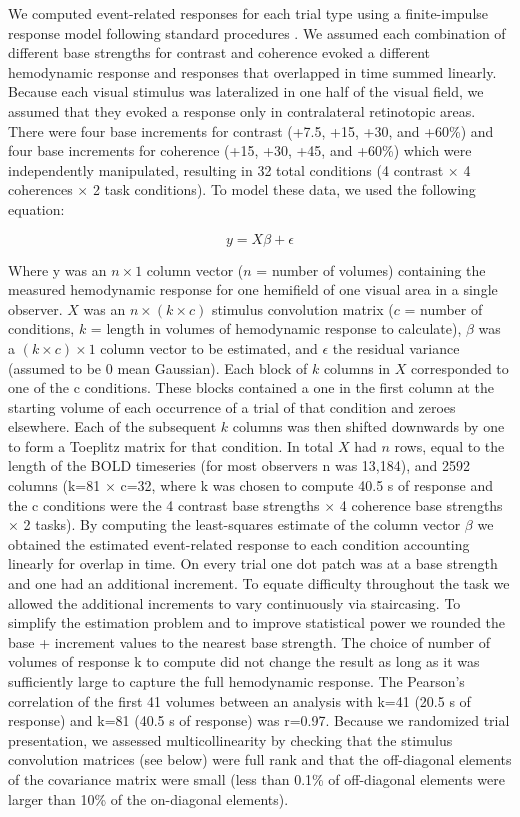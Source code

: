 We computed event-related responses for each trial type using a finite-impulse response model \citep{Zarahn1997-jc} following standard procedures \citep{Gardner2005-pg}. We assumed each combination of different base strengths for contrast and coherence evoked a different hemodynamic response and responses that overlapped in time summed linearly. Because each visual stimulus was lateralized in one half of the visual field, we assumed that they evoked a response only in contralateral retinotopic areas. There were four base increments for contrast (+7.5, +15, +30, and +60\%) and four base increments for coherence (+15, +30, +45, and +60\%) which were independently manipulated, resulting in 32 total conditions (4 contrast $\times$ 4 coherences $\times$ 2 task conditions). To model these data, we used the following equation:

\begin{equation}
    y=X\beta + \epsilon
\end{equation}

Where y was an $n\times1$ column vector ($n$ = number of volumes) containing the measured hemodynamic response for one hemifield of one visual area in a single observer. $X$ was an $n\times (k\times c)$ stimulus convolution matrix ($c$ = number of conditions, $k$ = length in volumes of hemodynamic response to calculate), $\beta$ was a $(k\times c)\times 1$ column vector to be estimated, and $\epsilon$ the residual variance (assumed to be 0 mean Gaussian). Each block of $k$ columns in $X$ corresponded to one of the c conditions. These blocks contained a one in the first column at the starting volume of each occurrence of a trial of that condition and zeroes elsewhere. Each of the subsequent $k$ columns was then shifted downwards by one to form a Toeplitz matrix for that condition. In total $X$ had $n$ rows, equal to the length of the BOLD timeseries (for most observers n was 13,184), and 2592 columns (k=81 $\times$ c=32, where k was chosen to compute 40.5 s of response and the c conditions were the 4 contrast base strengths $\times$ 4 coherence base strengths $\times$ 2 tasks). By computing the least-squares estimate of the column vector $\beta$ we obtained the estimated event-related response to each condition accounting linearly for overlap in time. On every trial one dot patch was at a base strength and one had an additional increment. To equate difficulty throughout the task we allowed the additional increments to vary continuously via staircasing. To simplify the estimation problem and to improve statistical power we rounded the base + increment values to the nearest base strength. The choice of number of volumes of response k to compute did not change the result as long as it was sufficiently large to capture the full hemodynamic response. The Pearson’s correlation of the first 41 volumes between an analysis with k=41 (20.5 s of response) and k=81 (40.5 s of response) was r=0.97.  Because we randomized trial presentation, we assessed multicollinearity by checking that the stimulus convolution matrices (see below) were full rank and that the off-diagonal elements of the covariance matrix were small (less than 0.1\% of off-diagonal elements were larger than 10\% of the on-diagonal elements).

